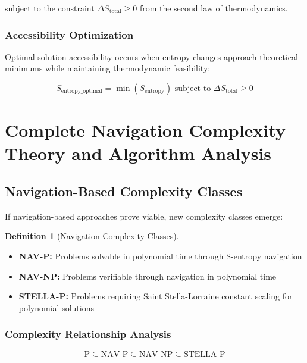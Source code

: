 \documentclass[11pt]{article}
\theoremstyle{definition}
\newtheorem{definition}[theorem]{Definition}
\theoremstyle{remark}
\begin{document}
subject to the constraint $\Delta S_{\text{total}} \geq 0$ from the second law of thermodynamics.

\subsubsection{Accessibility Optimization}

Optimal solution accessibility occurs when entropy changes approach theoretical minimums while maintaining thermodynamic feasibility:

\begin{equation}
S_{\text{entropy\_optimal}} = \min\left(S_{\text{entropy}}\right) \text{ subject to } \Delta S_{\text{total}} \geq 0
\end{equation}

\section{Complete Navigation Complexity Theory and Algorithm Analysis}

\subsection{Navigation-Based Complexity Classes}

If navigation-based approaches prove viable, new complexity classes emerge:

\begin{definition}[Navigation Complexity Classes]
\begin{itemize}
\item \textbf{NAV-P:} Problems solvable in polynomial time through S-entropy navigation
\item \textbf{NAV-NP:} Problems verifiable through navigation in polynomial time
\item \textbf{STELLA-P:} Problems requiring Saint Stella-Lorraine constant scaling for polynomial solutions
\end{itemize}
\end{definition}

\subsubsection{Complexity Relationship Analysis}

\begin{equation}
\text{P} \subseteq \text{NAV-P} \subseteq \text{NAV-NP} \subseteq \text{STELLA-P}
\end{equation}
\end{document}
